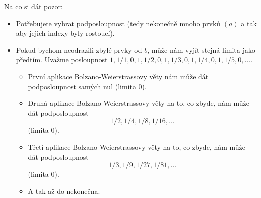 {	Na co si dát pozor:
	\begin{itemize}

		\item  Potřebujete vybrat podposloupnost (tedy nekonečně mnoho prvků $(a)$ a tak aby jejich indexy byly rostoucí).

		\item  Pokud bychom neodrazili zbylé prvky od $b$, může nám vyjít stejná limita jako předtím.
			Uvažme posloupnost $1, 1/1, 0, 1, 1/2, 0, 1, 1/3, 0, 1, 1/4, 0, 1, 1/5, 0, \ldots$.

			\begin{itemize}

				\item  První aplikace Bolzano-Weierstrassovy věty nám může dát podposloupnost samých nul (limita 0).

				\item  Druhá aplikace Bolzano-Weierstrassovy věty na to, co zbyde, nám může dát podposloupnost
					$$1/2, 1/4, 1/8, 1/16, \ldots$$
					(limita 0).

				\item  Třetí aplikace Bolzano-Weierstrassovy věty na to, co zbyde, nám může dát podposloupnost
					$$1/3, 1/9, 1/27, 1/81, \ldots$$
					(limita 0).

				\item  A tak až do nekonečna.

			\end{itemize}

	\end{itemize}
}


